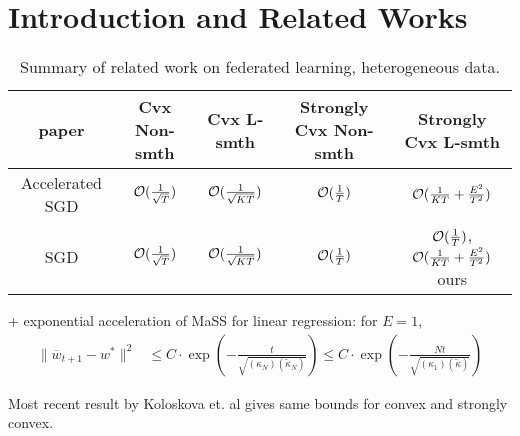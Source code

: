 

\section{Introduction and Related Works}


\begin{table}[h!]
	\centering
	\small
	\begin{tabular}{|c|c|c|c|c|}\hline
		paper         &  Cvx Non-smth & Cvx L-smth & Strongly Cvx Non-smth& Strongly Cvx L-smth \\ \hline
		Accelerated	SGD   &   ${\mathcal{O}}(\frac{1}{\sqrt{T}})$     & ${\mathcal{O}}(\frac{1}{\sqrt{KT}})$   &    ${\mathcal{O}}(\frac{1}{T})$   &  ${\mathcal{O}}(\frac{1}{KT}+\frac{E^2}{T^2})$    \\\hline
		SGD    &    ${\mathcal{O}}(\frac{1}{\sqrt{T}})$  &   ${\mathcal{O}}(\frac{1}{\sqrt{KT}})$  &  ${\mathcal{O}}(\frac{1}{T})$  & ${\mathcal{O}}(\frac{1}{T})$\cite{li2019convergence,haddadpour2019convergence}, ${\mathcal{O}}(\frac{1}{KT}+\frac{E^2}{T^2})$ ours    \\\hline
	\end{tabular}
	\caption{Summary of related work on federated learning, heterogeneous data.}
\end{table}

+ exponential acceleration of MaSS for linear regression: for $E=1$, 
\begin{align*}
\|\overline{w}_{t+1}-w^{\ast}\|^{2} & \leq C\cdot\exp(-\frac{t}{\sqrt{(\kappa_{N})(\tilde{\kappa}_{N})}})\leq C\cdot\exp(-\frac{Nt}{\sqrt{(\kappa_{1})(\tilde{\kappa})}})
\end{align*}

Most recent result by Koloskova et. al gives same bounds for convex and strongly convex.   

